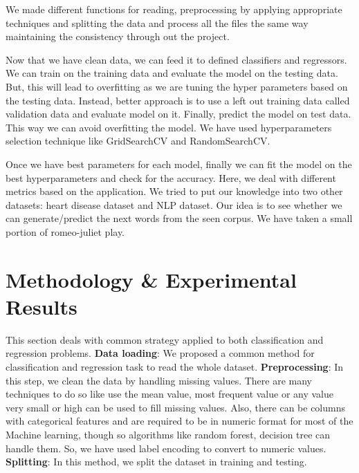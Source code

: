 \documentclass[10pt,twocolumn,letterpaper]{article}
\begin{document}
We made different functions for reading, preprocessing by applying appropriate techniques and splitting the data and process all the files the same way maintaining the consistency through out the project. 

Now that we have clean data, we can feed it to defined classifiers and regressors. We can train on the training data and evaluate the model on the testing data. But, this will lead to overfitting as we are tuning the hyper parameters based on the testing data. Instead, better approach is to use a left out training data called validation data and evaluate model on it. Finally, predict the model on test data. This way we can avoid overfitting the model. We have used hyperparameters selection technique like GridSearchCV and RandomSearchCV.

Once we have best parameters for each model, finally we can fit the model on the best hyperparameters and check for the accuracy. Here, we deal with different metrics based on the application.
We tried to put our knowledge into two other datasets: heart disease dataset and NLP dataset. Our idea is to see whether we can generate/predict the next words from the seen corpus. We have taken a small portion of romeo-juliet play. 



\section{Methodology \& Experimental Results}
This section deals with common strategy applied to both classification and regression problems. 
\newline\textbf{Data loading}: We proposed a common method for classification and regression task to read the whole dataset. 
\textbf{Preprocessing}: In this step, we clean the data by handling missing values. There are many techniques to do so like use the mean value, most frequent value or any value very small or high can be used to fill missing values. Also, there can be columns with categorical features and are required to be in numeric format for most of the Machine learning, though so algorithms like random forest, decision tree can handle them. So, we have used label encoding to convert to numeric values.
\textbf{Splitting}: In this method, we split the dataset in training and testing.  
\end{document}

